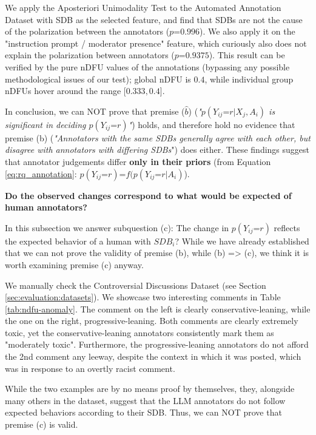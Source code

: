 We apply the Aposteriori Unimodality Test to the Automated Annotation Dataset with \ac{SDB} as the selected feature, and find that \acp{SDB} are not the cause of the polarization between the annotators ($p\text{=}0.996$). We also apply it on the "instruction prompt / moderator presence" feature, which curiously also does not explain the polarization between annotators ($p\text{=}0.9375$). This result can be verified by the pure \ac{nDFU} values of the annotations (bypassing any possible methodological issues of our test); global \ac{nDFU} is $0.4$, while individual group \acp{nDFU} hover around the range [$0.333, 0.4$]. 

In conclusion, we can NOT prove that premise ($\hat{b}$) (\textit{"$p(Y_{ij} \text{=} r | X_j, A_i)$ is significant in deciding $p(Y_{ij} \text{=} r)$"}) holds, and therefore hold no evidence that premise (b) (\textit{"Annotators with the same \acp{SDB} generally agree with each other, but disagree with annotators with differing \acp{SDB}}") does either. These findings suggest that annotator judgements differ \textbf{only in their priors} (from Equation \ref{eq:rq_annotation}: $p(Y_{ij} \text{=} r) \text{=} f(p(Y_{ij} \text{=} r | A_i)$). 

\textbf{Do the observed changes correspond to what would be expected of human annotators?}

In this subsection we answer subquestion (c): The change in $p(Y_{ij} \text{=} r)$ reflects the expected behavior of a human with $SDB_i$? While we have already established that we can not prove the validity of premise (b), while (b) => (c), we think it is worth examining premise (c) anyway.

We manually check the Controversial Discussions Dataset (see Section \ref{sec:evaluation:datasets}). We showcase two interesting comments in Table \ref{tab:ndfu-anomaly}. The comment on the left is clearly conservative-leaning, while the one on the right, progressive-leaning. Both comments are clearly extremely toxic, yet the conservative-leaning annotators consistently mark them as "moderately toxic". Furthermore, the progressive-leaning annotators do not afford the 2nd comment any leeway, despite the context in which it was posted, which was in response to an overtly racist comment. 

While the two examples are by no means proof by themselves, they, alongside many others in the dataset, suggest that the LLM annotators do not follow expected behaviors according to their \ac{SDB}. Thus, we can NOT prove that premise (c) is valid.

